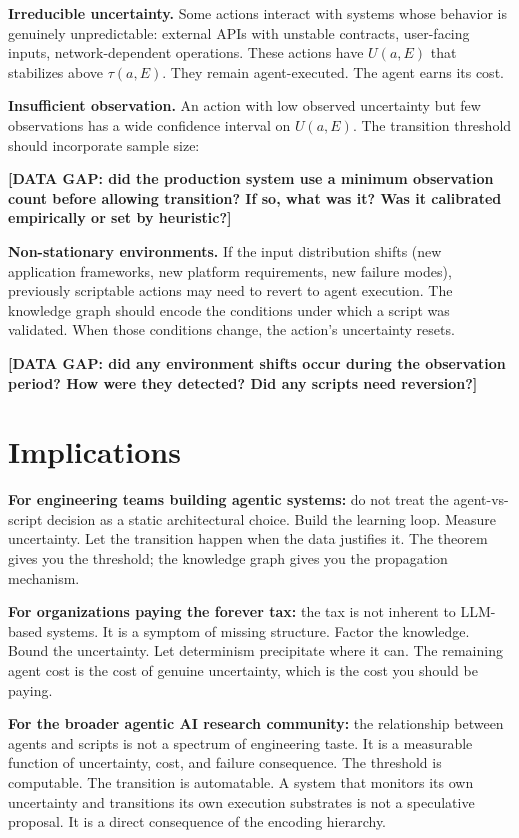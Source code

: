\documentclass[11pt]{article}
\theoremstyle{definition}
\begin{document}
\textbf{Irreducible uncertainty.} Some actions interact with systems
whose behavior is genuinely unpredictable: external APIs with unstable
contracts, user-facing inputs, network-dependent operations. These
actions have $U(a, E)$ that stabilizes above $\tau(a, E)$. They remain
agent-executed. The agent earns its cost.

\textbf{Insufficient observation.} An action with low observed
uncertainty but few observations has a wide confidence interval on
$U(a, E)$. The transition threshold should incorporate sample size:

\textbf{[DATA GAP: did the production system use a minimum observation
count before allowing transition? If so, what was it? Was it
calibrated empirically or set by heuristic?]}

\textbf{Non-stationary environments.} If the input distribution shifts
(new application frameworks, new platform requirements, new failure
modes), previously scriptable actions may need to revert to agent
execution. The knowledge graph should encode the conditions under
which a script was validated. When those conditions change, the
action's uncertainty resets.

\textbf{[DATA GAP: did any environment shifts occur during the
observation period? How were they detected? Did any scripts need
reversion?]}

\section{Implications}
\label{sec:implications}

\textbf{For engineering teams building agentic systems:} do not treat
the agent-vs-script decision as a static architectural choice. Build
the learning loop. Measure uncertainty. Let the transition happen when
the data justifies it. The theorem gives you the threshold; the
knowledge graph gives you the propagation mechanism.

\textbf{For organizations paying the forever tax:} the tax is not
inherent to LLM-based systems. It is a symptom of missing structure.
Factor the knowledge. Bound the uncertainty. Let determinism
precipitate where it can. The remaining agent cost is the cost of
genuine uncertainty, which is the cost you should be paying.

\textbf{For the broader agentic AI research community:} the
relationship between agents and scripts is not a spectrum of
engineering taste. It is a measurable function of uncertainty, cost,
and failure consequence. The threshold is computable. The transition
is automatable. A system that monitors its own uncertainty and
transitions its own execution substrates is not a speculative
proposal. It is a direct consequence of the encoding hierarchy.
\end{document}
